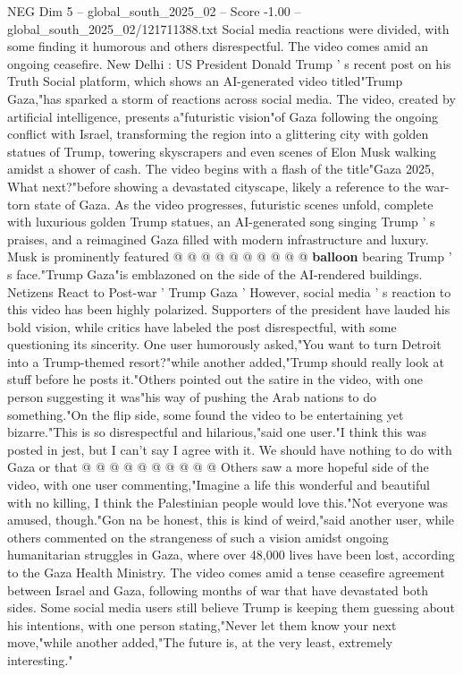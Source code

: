 \begin{textsample}{NEG Dim 5 – global\_south\_2025\_02 – Score -1.00 – global\_south\_2025\_02/121711388.txt}  \label{ex:f5_neg_241}
Social media reactions were divided, with some finding it humorous and others disrespectful.
The video comes amid an ongoing ceasefire.
New Delhi : US President Donald Trump ' s recent post on his Truth Social platform, which shows an AI-generated video titled"Trump Gaza,"has sparked a storm of reactions across social media.
The video, created by artificial intelligence, presents a"futuristic vision"of Gaza following the ongoing conflict with Israel, transforming the region into a glittering city with golden statues of Trump, towering skyscrapers and even scenes of Elon Musk walking amidst a shower of cash.
The video begins with a flash of the title"Gaza 2025, What next?"before showing a devastated cityscape, likely a reference to the war-torn state of Gaza.
As the video progresses, futuristic scenes unfold, complete with luxurious golden Trump statues, an AI-generated song singing Trump ' s praises, and a reimagined Gaza filled with modern infrastructure and luxury.
Musk is prominently featured @ @ @ @ @ @ @ @ @ @ \textbf{balloon} bearing Trump ' s face."Trump Gaza"is emblazoned on the side of the AI-rendered buildings.
Netizens React to Post-war ' Trump Gaza ' However, social media ' s reaction to this video has been highly polarized.
Supporters of the president have lauded his bold vision, while critics have labeled the post disrespectful, with some questioning its sincerity.
One user humorously asked,"You want to turn Detroit into a Trump-themed resort?"while another added,"Trump should really look at stuff before he posts it."Others pointed out the satire in the video, with one person suggesting it was"his way of pushing the Arab nations to do something."On the flip side, some found the video to be entertaining yet bizarre."This is so disrespectful and hilarious,"said one user."I think this was posted in jest, but I can't say I agree with it.
We should have nothing to do with Gaza or that @ @ @ @ @ @ @ @ @ @ Others saw a more hopeful side of the video, with one user commenting,"Imagine a life this wonderful and beautiful with no killing, I think the Palestinian people would love this."Not everyone was amused, though."Gon na be honest, this is kind of weird,"said another user, while others commented on the strangeness of such a vision amidst ongoing humanitarian struggles in Gaza, where over 48,000 lives have been lost, according to the Gaza Health Ministry.
The video comes amid a tense ceasefire agreement between Israel and Gaza, following months of war that have devastated both sides.
Some social media users still believe Trump is keeping them guessing about his intentions, with one person stating,"Never let them know your next move,"while another added,"The future is, at the very least, extremely interesting."

\end{textsample}
